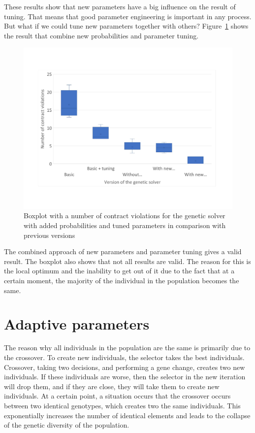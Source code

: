 These results show that new parameters have a big influence on the result of tuning. That means that good parameter engineering is important in any process.  But what if we could tune new parameters together with others?
Figure~\ref{fig:boxplotsolverNewParametersTuning} shows the result that combine new probabilities and parameter tuning.
\begin{figure}
	\centering
	\includegraphics[width=\textwidth]{images/BoxPlotSolverNewParametersTuning.pdf}
	\caption[Boxplot with a number of contract violations for the genetic solver with added probabilities and tuned parameters in comparison with previous versions]{Boxplot with a number of contract violations for the genetic solver with added probabilities and tuned parameters in comparison with previous versions}
	\label{fig:boxplotsolverNewParametersTuning}
\end{figure}

The combined approach of new parameters and parameter tuning gives a valid result. The boxplot also shows that not all results are valid. The reason for this is the local optimum and the inability to get out of it due to the fact that at a certain moment, the majority of the individual in the population becomes the same. 

\section{Adaptive parameters}
The reason why all individuals in the population are the same is primarily due to the crossover. To create new individuals, the selector takes the best individuals. Crossover, taking two decisions, and performing a gene change, creates two new individuals. If these individuals are worse, then the selector in the new iteration will drop them, and if they are close, they will take them to create new individuals. At a certain point, a situation occurs that the crossover occurs between two identical genotypes, which creates two the same individuals. This exponentially increases the number of identical elements and leads to the collapse of the genetic diversity of the population.

